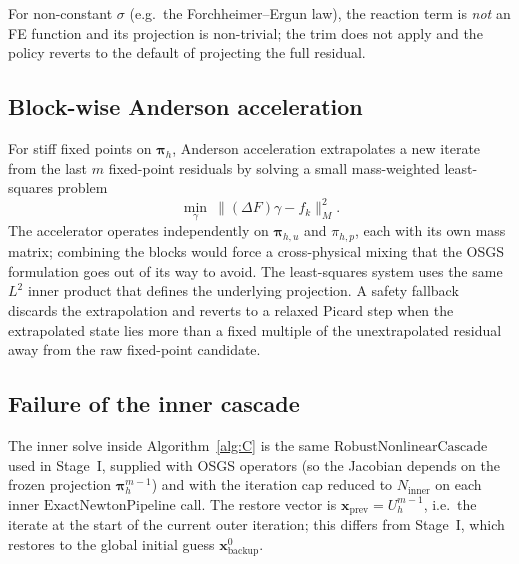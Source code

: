 \documentclass{article}
\begin{document}
For non-constant $\sigma$ (e.g.\ the Forchheimer--Ergun law), the
reaction term is \emph{not} an FE function and its projection is
non-trivial; the trim does not apply and the policy reverts to the
default of projecting the full residual.

\subsection{Block-wise Anderson acceleration}
\label{sec:anderson}

For stiff fixed points on $\boldsymbol{\pi}_h$, Anderson acceleration
extrapolates a new iterate from the last $m$ fixed-point residuals by
solving a small mass-weighted least-squares problem
\begin{equation}
    \min_\gamma\ \|(\Delta F)\gamma - f_k\|_M^2.
\end{equation}
The accelerator operates independently on $\boldsymbol{\pi}_{h,u}$ and
$\pi_{h,p}$, each with its own mass matrix; combining the blocks would
force a cross-physical mixing that the OSGS formulation goes out of
its way to avoid. The least-squares system uses the same $L^2$ inner
product that defines the underlying projection. A safety fallback
discards the extrapolation and reverts to a relaxed Picard step when
the extrapolated state lies more than a fixed multiple of the
unextrapolated residual away from the raw fixed-point candidate.

\subsection{Failure of the inner cascade}
\label{sec:osgs-inner-failure}

The inner solve inside Algorithm~\ref{alg:C} is the same
$\mathrm{RobustNonlinearCascade}$ used in Stage~I, supplied with
OSGS operators (so the Jacobian depends on the frozen projection
$\boldsymbol{\pi}_h^{m-1}$) and with the iteration cap reduced to
$N_{\mathrm{inner}}$ on each inner $\mathrm{ExactNewtonPipeline}$ call.
The restore vector is $\boldsymbol{x}_{\mathrm{prev}} = U_h^{m-1}$,
i.e.\ the iterate at the start of the current outer iteration; this
differs from Stage~I, which restores to the global initial guess
$\boldsymbol{x}^0_{\mathrm{backup}}$.
\end{document}
